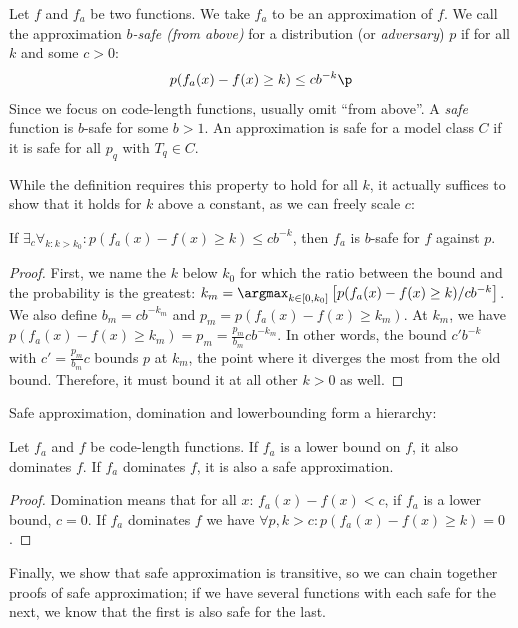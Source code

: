 \begin{definition}
Let $f$ and $f_a$ be two functions. We take $f_a$ to be an approximation of $f$. We call the approximation \emph{$b$-safe (from above)} for a distribution (or \emph{adversary}) $p$ if for all $k$ and some $c > 0$: 
\[
p(f_a(x) - f(x) \geq k) \leq c b^{-k} \p
\] 
Since we focus on code-length functions, usually omit ``from above''. A \emph{safe} function is $b$-safe for some $b > 1$. An approximation is safe for a model class $C$ if it is safe for all $p_q$ with $T_q \in C$.
\label{definition:safety}
\end{definition}

\noindent While the definition requires this property to hold for all $k$, it actually suffices to show that it holds for $k$ above a constant, as we can freely scale $c$:

\begin{lemma}
If $\exists_{c} \forall_{k: k >k_0} : p(f_a(x) - f(x) \geq k) \leq c b^{-k}$, then $f_a$ is $b$-safe for $f$ against $p$. \label{lemma:k-zero}
\end{lemma}
\begin{proof}
First, we name the $k$ below $k_0$ for which the ratio between the bound and the probability is the greatest: $k_m = \argmax_{k\in [0, k_0]} \left[p(f_a(x) - f(x) \geq k)/cb^{-k}\right]$. We also define $b_m = cb^{-k_m}$ and $p_m = p(f_a(x) - f(x) \geq k_m)$. At $k_m$, we have $p(f_a(x) - f(x)\geq k_m) = p_m = \frac{p_m}{b_m}cb^{-k_m}$. In other words, the bound $c'b^{-k}$ with $c' = \frac{p_m}{b_m}c$ bounds $p$ at $k_m$, the point where it diverges the most from the old bound. Therefore, it must bound it at all other $k >0$ as well.
\end{proof}

\noindent Safe approximation, domination and lowerbounding form a hierarchy:

\begin{lemma}
Let $f_a$ and $f$ be code-length functions. If $f_a$ is a lower bound on $f$, it also dominates $f$. If $f_a$ dominates $f$, it is also a safe approximation.
\label{lemma:domination-safety}
\end{lemma}
\begin{proof}
Domination means that for all $x$: $f_a(x) - f(x) < c$, if $f_a$ is a lower bound, $c=0$. If $f_a$ dominates $f$ we have  
$\forall p, k > c : p(f_a(x) - f(x) \geq k) = 0$.
\end{proof}
Finally, we show that safe approximation is transitive, so we can chain together proofs of safe approximation; if we have several functions with each safe for the next, we know that the first is also safe for the last.

